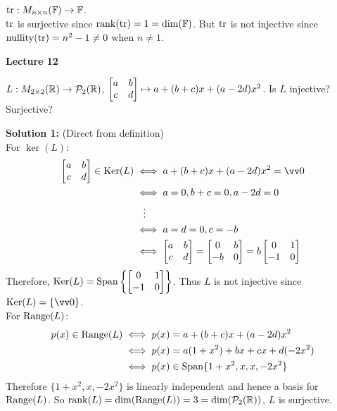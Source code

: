 \begin{example}
    $\operatorname{tr}:M_{n \times n}({\mathbb{F}}) \to {\mathbb{F}}$. \\
    $\operatorname{tr}$ is surjective since $\operatorname{rank}(\operatorname{tr}) = 1 = \dim({\mathbb{F}})$. But $\operatorname{tr}$ is not injective since $\operatorname{nullity}(\operatorname{tr}) = n^2 - 1 \neq 0$ when $n \neq 1$.
\end{example}

\pagebreak
 
\makebox[\linewidth]{\hrulefill}
{\large \textbf{Lecture 12}}

\begin{example}
    \phantom{}
    \item $L:M_{2 \times 2}({\mathbb{R}}) \to \mathcal{P}_2({\mathbb{R}})$, $\begin{bmatrix} a & b \\ c & d \end{bmatrix} \mapsto a + (b+c)x + (a-2d)x^2$. Is $L$ injective? Surjective?
        
        \textbf{Solution 1:} (Direct from definition) \\
        For $\ker(L)$: \vspace{-4mm}
        \begin{align*}
            \cv{a & b \\ c & d} \in \ker(L) &\iff a + (b+c)x + (a-2d)x^2 = \vzero \\
            &\iff a=0, b+c=0, a-2d=0 \\
            &\phantom{if}\vdots \\
            &\iff a=d=0, c=-b \\
            &\iff \cv{a & b \\ c & d} = \cv{0 & b \\ -b & 0} = b\cv{0 & 1 \\ -1 & 0}
        \end{align*}
        \vspace{-2mm}Therefore, $\operatorname{Ker}(L) = \operatorname{Span} \left\{ \begin{bmatrix} 0 & 1 \\ -1 & 0 \end{bmatrix} \right\}$. Thus $L$ is not injective since $\ker(L) = \{\vzero\}$. \\

        For $\operatorname{Range}(L)$: \vspace{-4mm}
        \begin{align*}
            p(x) \in \operatorname{Range}(L) &\iff p(x) = a + (b+c)x + (a-2d)x^2 \\
            &\iff p(x) = a(1+x^2) + bx + cx + d(-2x^2) \\
            &\iff p(x) \in \operatorname{Span}\{1+x^2, x, x, -2x^2\}
        \end{align*}
        Therefore $\{1+x^2, x, -2x^2\}$ is linearly independent and hence a basis for $\operatorname{Range}(L)$. So $\operatorname{rank}(L) = \dim(\operatorname{Range}(L)) = 3 = \dim(\mathcal{P}_2({\mathbb{R}}))$, $L$ is surjective.


\end{example}
